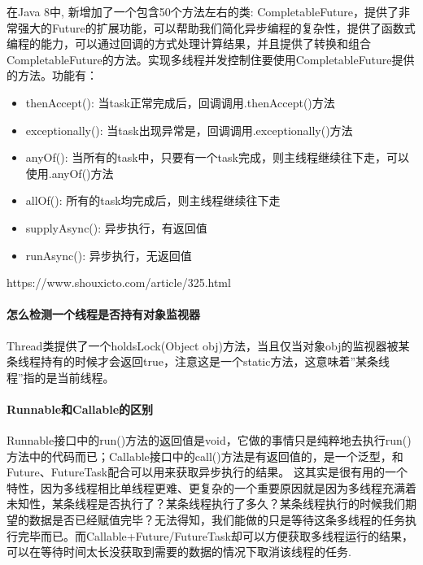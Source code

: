 \documentclass[../../../interview-questions.tex]{subfiles}
\begin{document}
在Java 8中, 新增加了一个包含50个方法左右的类: CompletableFuture，提供了非常强大的Future的扩展功能，可以帮助我们简化异步编程的复杂性，提供了函数式编程的能力，可以通过回调的方式处理计算结果，并且提供了转换和组合CompletableFuture的方法。实现多线程并发控制住要使用CompletableFuture提供的方法。功能有：

\begin{itemize}
    \item {thenAccept(): 当task正常完成后，回调调用.thenAccept()方法}
    \item {exceptionally(): 当task出现异常是，回调调用.exceptionally()方法}
    \item {anyOf(): 当所有的task中，只要有一个task完成，则主线程继续往下走，可以使用.anyOf()方法}
    \item {allOf(): 所有的task均完成后，则主线程继续往下走}
    \item {supplyAsync(): 异步执行，有返回值}
    \item {runAsync(): 异步执行，无返回值}
\end{itemize}

https://www.shouxicto.com/article/325.html

\paragraph{怎么检测一个线程是否持有对象监视器}

Thread类提供了一个holdsLock(Object obj)方法，当且仅当对象obj的监视器被某条线程持有的时候才会返回true，注意这是一个static方法，这意味着”某条线程”指的是当前线程。

\paragraph{Runnable和Callable的区别}

Runnable接口中的run()方法的返回值是void，它做的事情只是纯粹地去执行run()方法中的代码而已；Callable接口中的call()方法是有返回值的，是一个泛型，和Future、FutureTask配合可以用来获取异步执行的结果。
这其实是很有用的一个特性，因为多线程相比单线程更难、更复杂的一个重要原因就是因为多线程充满着未知性，某条线程是否执行了？某条线程执行了多久？某条线程执行的时候我们期望的数据是否已经赋值完毕？无法得知，我们能做的只是等待这条多线程的任务执行完毕而已。而Callable+Future/FutureTask却可以方便获取多线程运行的结果，可以在等待时间太长没获取到需要的数据的情况下取消该线程的任务.
\end{document}
